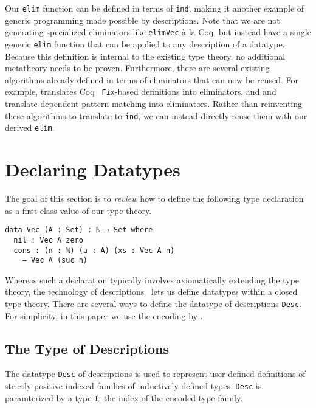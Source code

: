 \documentclass[preprint,nonatbib]{sigplanconf}
\begin{document}
Our {\tt elim} function can be defined in terms of
{\tt ind}, making it another example of generic programming made
possible by descriptions.
Note that we are not generating specialized eliminators like
{\tt elimVec} à la {\sc Coq}, but instead have a single generic
{\tt elim} function that can be applied to any description of a
datatype.
Because this definition is internal to the
existing type theory, no additional metatheory needs to be proven.
Furthermore, there are several existing algorithms already defined in
terms of eliminators that can now be reused.
For example, \citet{gimenez1995codifying} translates
{\sc Coq}~\citeyearpar{coq08} {\tt Fix}-based definitions into eliminators,
and \citet{Goguen06eliminatingdependent} and
\citet{McBride:2000:EM:646540.759262}
translate dependent pattern matching into
eliminators. Rather than reinventing these algorithms to translate to
{\tt ind}, we can instead directly reuse them with our derived {\tt elim}.

\section{Declaring Datatypes}
\label{sec:background}

The goal of this section is to {\it review} how to define the following type
declaration as a first-class value of our type theory. 

\begin{verbatim}
data Vec (A : Set) : ℕ → Set where
  nil : Vec A zero
  cons : (n : ℕ) (a : A) (xs : Vec A n)
    → Vec A (suc n)
\end{verbatim}

Whereas such a declaration typically involves axiomatically extending
the type theory, the technology of
descriptions~\citep{Chapman:2010:GAL:1932681.1863547,mcbride2010ornamental,dagand:phd}
lets us define datatypes within a closed type theory.
There are
several ways to define the datatype of descriptions {\tt Desc}. 
For simplicity, in this paper we use the encoding by
\citet{mcbride2010ornamental}.


\subsection{The Type of Descriptions}

The datatype {\tt Desc} of descriptions is used to represent
user-defined definitions of strictly-positive indexed
families of inductively defined types.
{\tt Desc} is paramterized by 
a type {\tt I}, the index of the encoded type family.
\end{document}
